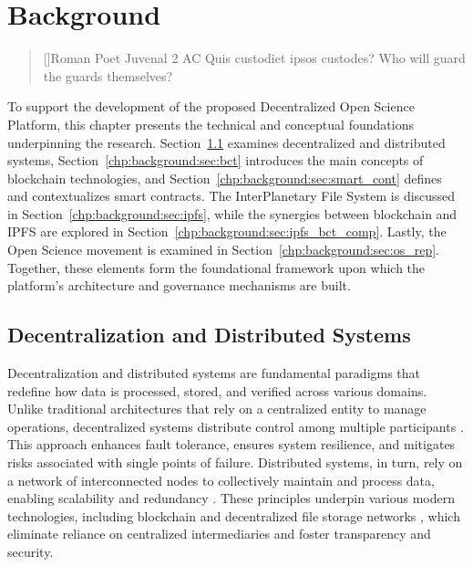 \documentclass[final]{rc-book-2.14}
\begin{document}
\chapter{Background}
\label{chp:background}

\begin{quotation}[]{Roman Poet Juvenal  2 AC}
    Quis custodiet ipsos custodes?  Who will guard the guards themselves?
\end{quotation}

\drop To support the development of the proposed Decentralized Open Science Platform, this chapter presents the technical and conceptual foundations underpinning the research.
Section~\ref{chp:background:sec:dec_dist} examines decentralized and distributed systems, Section~\ref{chp:background:sec:bct} introduces the main concepts of blockchain technologies, and Section~\ref{chp:background:sec:smart_cont} defines and contextualizes smart contracts. The InterPlanetary File System is discussed in Section~\ref{chp:background:sec:ipfs}, while the synergies between blockchain and IPFS are explored in Section~\ref{chp:background:sec:ipfs_bct_comp}. Lastly, the Open Science movement is examined in Section~\ref{chp:background:sec:os_rep}. Together, these elements form the foundational framework upon which the platform’s architecture and governance mechanisms are built.


\newpage

\section{Decentralization and Distributed Systems}
\label{chp:background:sec:dec_dist}

Decentralization and distributed systems are fundamental paradigms that redefine how data is processed, stored, and verified across various domains. Unlike traditional architectures that rely on a centralized entity to manage operations, decentralized systems distribute control among multiple participants \cite{coulouris2011distributed}. This approach enhances fault tolerance, ensures system resilience, and mitigates risks associated with single points of failure. Distributed systems, in turn, rely on a network of interconnected nodes to collectively maintain and process data, enabling scalability and redundancy   \cite{lamport_1978, coulouris2011distributed}. These principles underpin various modern technologies, including blockchain \cite{nakamoto2008bitcoin} and decentralized file storage networks \cite{benet2014ipfs}, which eliminate reliance on centralized intermediaries and foster transparency and security.
\end{document}
